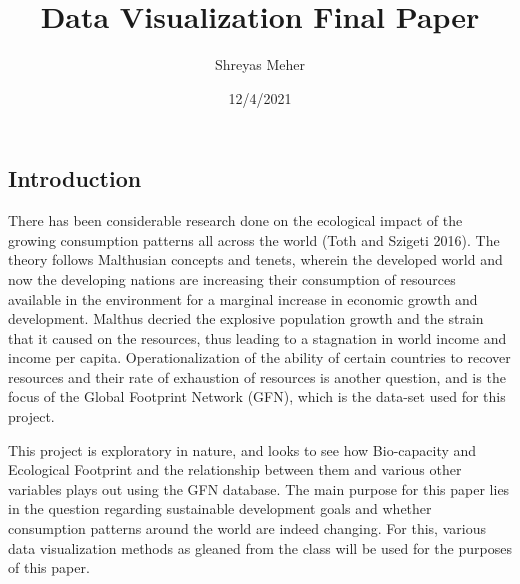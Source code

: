 \documentclass[
]{article}
\title{Data Visualization Final Paper}
\author{Shreyas Meher}
\date{12/4/2021}
\newenvironment{Shaded}{\begin{snugshade}}{\end{snugshade}}
\newcommand{\AttributeTok}[1]{\textcolor[rgb]{0.77,0.63,0.00}{#1}}
\newcommand{\CommentTok}[1]{\textcolor[rgb]{0.56,0.35,0.01}{\textit{#1}}}
\newcommand{\ConstantTok}[1]{\textcolor[rgb]{0.00,0.00,0.00}{#1}}
\newcommand{\FunctionTok}[1]{\textcolor[rgb]{0.00,0.00,0.00}{#1}}
\newcommand{\NormalTok}[1]{#1}
\newcommand{\OtherTok}[1]{\textcolor[rgb]{0.56,0.35,0.01}{#1}}
\newcommand{\SpecialCharTok}[1]{\textcolor[rgb]{0.00,0.00,0.00}{#1}}
\newcommand{\StringTok}[1]{\textcolor[rgb]{0.31,0.60,0.02}{#1}}
\begin{document}
\maketitle

\begin{Shaded}
\end{Shaded}

\hypertarget{introduction}{%
\subsection{Introduction}\label{introduction}}

There has been considerable research done on the ecological impact of
the growing consumption patterns all across the world (Toth and Szigeti
2016). The theory follows Malthusian concepts and tenets, wherein the
developed world and now the developing nations are increasing their
consumption of resources available in the environment for a marginal
increase in economic growth and development. Malthus decried the
explosive population growth and the strain that it caused on the
resources, thus leading to a stagnation in world income and income per
capita. Operationalization of the ability of certain countries to
recover resources and their rate of exhaustion of resources is another
question, and is the focus of the Global Footprint Network (GFN), which
is the data-set used for this project.

This project is exploratory in nature, and looks to see how Bio-capacity
and Ecological Footprint and the relationship between them and various
other variables plays out using the GFN database. The main purpose for
this paper lies in the question regarding sustainable development goals
and whether consumption patterns around the world are indeed changing.
For this, various data visualization methods as gleaned from the class
will be used for the purposes of this paper.
\end{document}
